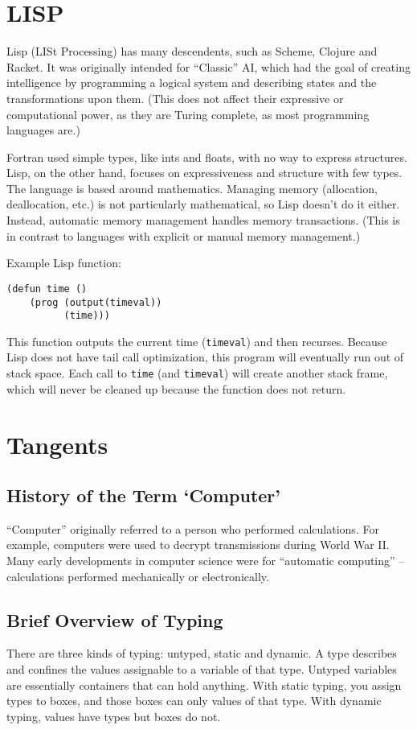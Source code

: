 \documentclass[twoside]{article}
\begin{document}
\section{LISP}

Lisp (LISt Processing) has many descendents, such as Scheme, Clojure and Racket.
It was originally intended for ``Classic'' AI, which had the goal of creating
intelligence by programming a logical system and describing states and the
transformations upon them. (This does not affect their expressive or
computational power, as they are Turing complete, as most programming languages
are.)

Fortran used simple types, like ints and floats, with no way to express
structures. Lisp, on the other hand, focuses on expressiveness and structure
with few types. The language is based around mathematics. Managing memory
(allocation, deallocation, etc.) is not particularly mathematical, so Lisp
doesn't do it either. Instead, automatic memory management handles memory
transactions. (This is in contrast to languages with explicit or manual memory
management.)

Example Lisp function:
\begin{verbatim}
(defun time ()
    (prog (output(timeval))
          (time)))
\end{verbatim}
This function outputs the current time (\texttt{timeval}) and then recurses.
Because Lisp does not have tail call optimization, this program will eventually
run out of stack space. Each call to \texttt{time} (and \texttt{timeval}) will
create another stack frame, which will never be cleaned up because the function
does not return.

\section{Tangents}

\subsection{History of the Term `Computer'}
``Computer'' originally referred to a person who performed calculations. For
example, computers were used to decrypt transmissions during World War II. Many
early developments in computer science were for ``automatic computing'' --
calculations performed mechanically or electronically.

\subsection{Brief Overview of Typing}
There are three kinds of typing: untyped, static and dynamic.
A type describes and confines the values assignable to a variable of that type.
Untyped variables are essentially containers that can hold anything. With static
typing, you assign types to boxes, and those boxes can only values of that type.
With dynamic typing, values have types but boxes do not.
\end{document}
